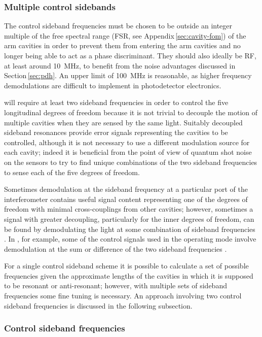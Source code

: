 \subsubsection{\label{sec:multiple-control-sidebands}Multiple control sidebands}
The control sideband frequencies must be chosen to be outside an integer multiple of the free spectral range (\gls{FSR}, see Appendix\,\ref{sec:cavity-fom}) of the arm cavities in order to prevent them from entering the arm cavities and no longer being able to act as a phase discriminant. They should also ideally be \gls{RF}, at least around \SI{10}{\mega\hertz}, to benefit from the noise advantages discussed in Section\,\ref{sec:pdh}. An upper limit of \SI{100}{\mega\hertz} is reasonable, as higher frequency demodulations are difficult to implement in photodetector electronics.

\ETLF{} will require at least two sideband frequencies in order to control the five longitudinal degrees of freedom because it is not trivial to decouple the motion of multiple cavities when they are sensed by the same light. Suitably decoupled sideband resonances provide error signals representing the cavities to be controlled, although it is not necessary to use a different modulation source for each cavity; indeed it is beneficial from the point of view of quantum shot noise on the sensors to try to find unique combinations of the two sideband frequencies to sense each of the five degrees of freedom.

Sometimes demodulation at the sideband frequency at a particular port of the interferometer contains useful signal content representing one of the degrees of freedom with minimal cross-couplings from other cavities; however, sometimes a signal with greater decoupling, particularly for the inner degrees of freedom, can be found by demodulating the light at some combination of sideband frequencies \cite{Strain2003, Barr2006}. In \ALIGO{}, for example, some of the control signals used in the operating mode involve demodulation at the sum or difference of the two sideband frequencies \cite{Abbott2010}.

For a single control sideband scheme it is possible to calculate a set of possible frequencies given the approximate lengths of the cavities in which it is supposed to be resonant or anti-resonant; however, with multiple sets of sideband frequencies some fine tuning is necessary. An approach involving two control sideband frequencies is discussed in the following subsection.

\subsubsection{Control sideband frequencies}

